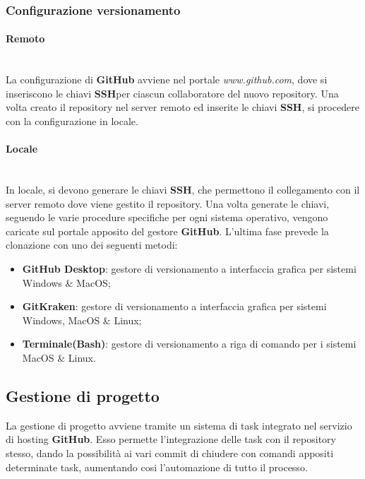\subsubsection{Configurazione versionamento}

\paragraph{Remoto} \-\\
	La configurazione di \textbf{GitHub} avviene nel portale \textit{www.github.com}, dove si inseriscono le chiavi \textbf{SSH}\glossario per ciascun collaboratore del nuovo repository. 
	Una volta creato il repository nel server remoto ed inserite le chiavi \textbf{SSH}, si procedere con la configurazione in locale.
	
\paragraph{Locale} \-\\
	In locale, si devono generare le chiavi \textbf{SSH}, che permettono il collegamento con il server remoto dove viene gestito il repository. 
	Una volta generate le chiavi, seguendo le varie procedure specifiche per ogni sistema operativo, vengono caricate sul portale apposito del gestore \textbf{GitHub}.
	L'ultima fase prevede la clonazione con uno dei seguenti metodi: 

	\begin{itemize}
		\item \textbf{GitHub Desktop}: gestore di versionamento a interfaccia grafica per sistemi Windows \& MacOS; 
		\item \textbf{GitKraken}: gestore di versionamento a interfaccia grafica per sistemi Windows, MacOS \& Linux; 		
		\item \textbf{Terminale(Bash)}: gestore di versionamento a riga di comando per i sistemi MacOS \& Linux.
	\end{itemize}
		
\subsection{Gestione di progetto}\label{ProcessiSupporto_GestioneProgetto}
La gestione di progetto avviene tramite un sistema di task integrato nel servizio di hosting \textbf{GitHub}. 
Esso permette l'integrazione delle task con il repository stesso, dando la possibilità ai vari commit di chiudere con comandi appositi determinate task, aumentando cosi l'automazione di tutto il processo. 

